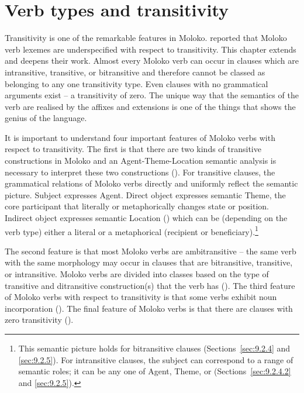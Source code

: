 \chapter[Verb types and transitivity]{Verb types and transitivity}\label{chap:9}
\hypertarget{RefHeading1212621525720847}{}
Transitivity is one of the remarkable features in Moloko. \citet{FriesenMamalis2008} reported that Moloko verb lexemes are underspecified with respect to transitivity.  This chapter extends and deepens their work. Almost every Moloko verb can occur in clauses which are intransitive, transitive, or bitransitive and therefore cannot be classed as belonging to any one transitivity type.  Even clauses with no grammatical arguments exist -- a transitivity of zero. The unique way that the semantics of the verb are realised by the affixes and extensions is one of the things that shows the genius of the language. 

It is important to understand four important features of Moloko verbs with respect to transitivity. The first is that there are two kinds of transitive constructions in Moloko and an Agent-Theme-Location semantic analysis is necessary to interpret these two constructions (). For transitive clauses, the grammatical relations of Moloko verbs directly and uniformly reflect the semantic picture. Subject expresses Agent. Direct object expresses semantic Theme, the core participant that literally or metaphorically changes state or position. Indirect object expresses semantic Location (\LOC) which can be  (depending on the verb type) either a literal or a metaphorical \LOC (recipient or beneficiary).\footnote{This semantic picture holds for bitransitive clauses (Sections~\ref{sec:9.2.4} and \ref{sec:9.2.5}). For intransitive clauses, the subject can correspond to a range of semantic roles; it can be any one of Agent, Theme, or \LOC (Sections~\ref{sec:9.2.4.2} and \ref{sec:9.2.5}).}

The second feature is that most Moloko verbs are ambitransitive -- the same verb with the same morphology may occur in clauses that are bitransitive, transitive, or intransitive. Moloko verbs are divided into classes based on the type of transitive and ditransitive construction(s) that the verb has ().  The third feature of Moloko verbs with respect to transitivity is that some verbs exhibit noun incorporation (). The final feature of Moloko verbs is that there are clauses with zero transitivity ().

